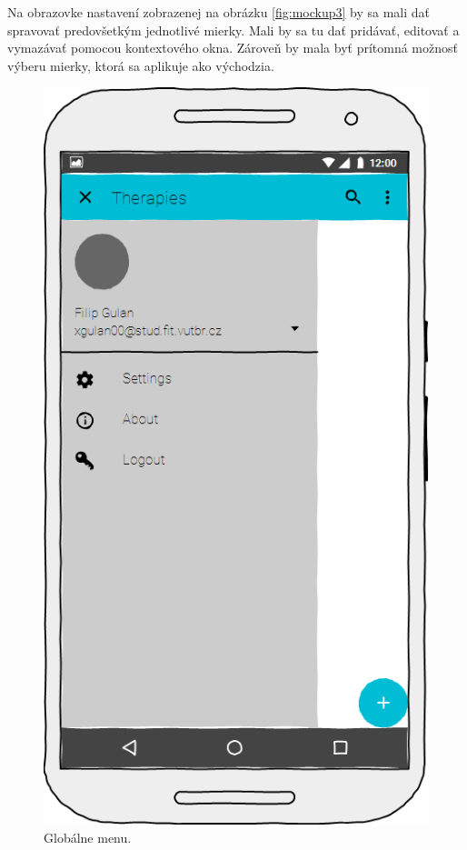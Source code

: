 Na obrazovke nastavení zobrazenej na obrázku \ref{fig:mockup3} by sa mali dať spravovať predovšetkým jednotlivé mierky. Mali by sa tu dať pridávať, editovať a vymazávať pomocou kontextového okna. Zároveň by mala byť prítomná možnosť výberu mierky, ktorá sa aplikuje ako východzia.
\begin{figure}[h]
   \begin{minipage}{0.48\textwidth}
     \centering
     \includegraphics[scale=0.45]{fig/mockup2.png}
      \caption{Globálne menu.}
      \label{fig:mockup2}
   \end{minipage}\hfill

\end{figure}
